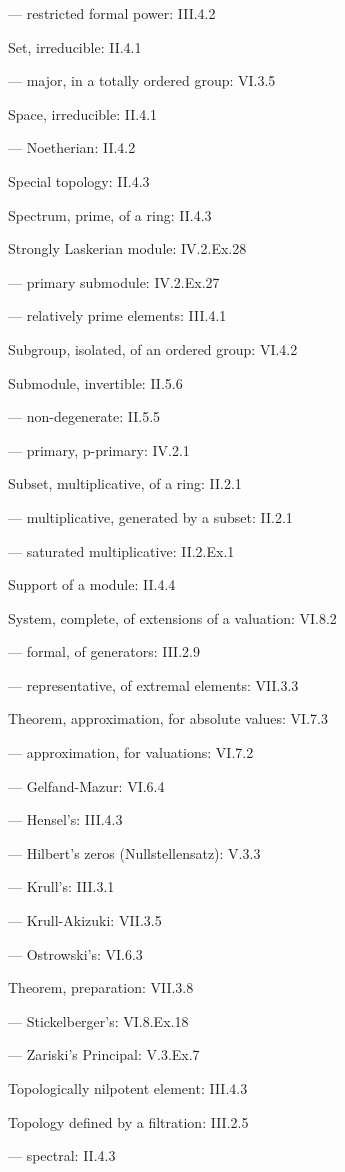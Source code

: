 --- restricted formal power: III.4.2

Set, irreducible: II.4.1

--- major, in a totally ordered group: VI.3.5

Space, irreducible: II.4.1

--- Noetherian: II.4.2

Special topology: II.4.3

Spectrum, prime, of a ring: II.4.3

Strongly Laskerian module: IV.2.Ex.28

--- primary submodule: IV.2.Ex.27

--- relatively prime elements: III.4.1

Subgroup, isolated, of an ordered group: VI.4.2

Submodule, invertible: II.5.6

--- non-degenerate: II.5.5

--- primary, p-primary: IV.2.1

Subset, multiplicative, of a ring: II.2.1

--- multiplicative, generated by a subset: II.2.1

--- saturated multiplicative: II.2.Ex.1

Support of a module: II.4.4

System, complete, of extensions of a valuation: VI.8.2

--- formal, of generators: III.2.9

--- representative, of extremal elements: VII.3.3

Theorem, approximation, for absolute values: VI.7.3

--- approximation, for valuations: VI.7.2

--- Gelfand-Mazur: VI.6.4

--- Hensel's: III.4.3

--- Hilbert's zeros (Nullstellensatz): V.3.3

--- Krull's: III.3.1

--- Krull-Akizuki: VII.3.5

--- Ostrowski's: VI.6.3

Theorem, preparation: VII.3.8

--- Stickelberger's: VI.8.Ex.18

--- Zariski's Principal: V.3.Ex.7

Topologically nilpotent element: III.4.3

Topology defined by a filtration: III.2.5

--- spectral: II.4.3


